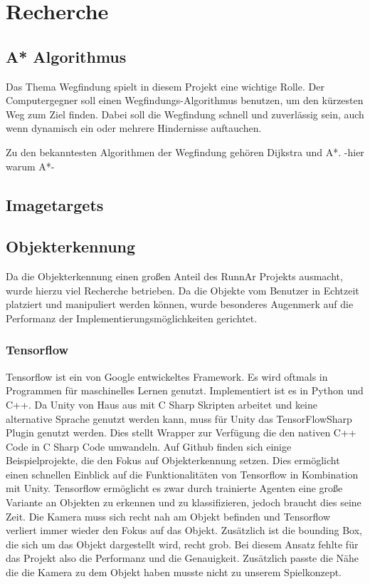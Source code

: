 \chapter{Recherche}
\label{sec:recherche}


\section{A* Algorithmus}
Das Thema Wegfindung spielt in diesem Projekt eine wichtige Rolle. Der Computergegner soll einen Wegfindungs-Algorithmus benutzen, um den kürzesten Weg zum Ziel finden. Dabei soll die Wegfindung schnell und zuverlässig sein, auch wenn dynamisch ein oder mehrere Hindernisse auftauchen.

Zu den bekanntesten Algorithmen der Wegfindung gehören Dijkstra und A*.
-hier warum A*-
\section{Imagetargets}
\section{Objekterkennung}
Da die Objekterkennung einen großen Anteil des RunnAr Projekts ausmacht, wurde hierzu viel Recherche betrieben. Da die Objekte vom Benutzer in Echtzeit platziert und manipuliert werden können, wurde besonderes Augenmerk auf die Performanz der Implementierungsmöglichkeiten gerichtet.
\subsection{Tensorflow}
Tensorflow ist ein von Google entwickeltes Framework. Es wird oftmals in Programmen für maschinelles Lernen genutzt.  Implementiert ist es in Python und C++. Da Unity von Haus aus mit C Sharp Skripten arbeitet und keine alternative Sprache genutzt werden kann, muss für Unity das TensorFlowSharp Plugin genutzt werden. Dies stellt Wrapper zur Verfügung die den nativen C++ Code in C Sharp Code umwandeln. Auf Github finden sich einige Beispielprojekte, die den Fokus auf Objekterkennung setzen. Dies ermöglicht einen schnellen Einblick auf die Funktionalitäten von Tensorflow in Kombination mit Unity. Tensorflow ermöglicht es zwar durch trainierte Agenten eine große Variante an Objekten zu erkennen und zu klassifizieren, jedoch braucht dies seine Zeit. Die Kamera muss sich recht nah am Objekt befinden und Tensorflow verliert immer wieder den Fokus auf das Objekt. Zusätzlich ist die bounding Box, die sich um das Objekt dargestellt wird, recht grob. Bei diesem Ansatz fehlte für das Projekt also die Performanz und die Genauigkeit. Zusätzlich passte die Nähe die die Kamera zu dem Objekt haben musste nicht zu unserem Spielkonzept.

